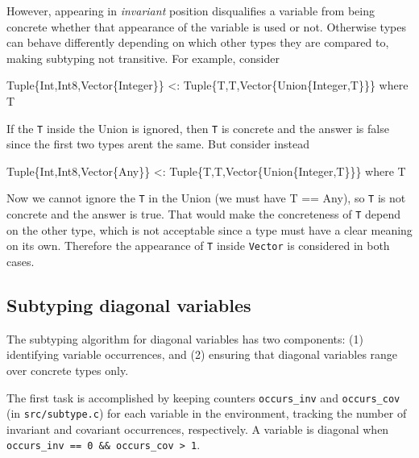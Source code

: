 However, appearing in \emph{invariant} position disqualifies a variable from being concrete whether that appearance of the variable is used or not. Otherwise types can behave differently depending on which other types they are compared to, making subtyping not transitive. For example, consider



Tuple\{Int,Int8,Vector\{Integer\}\} <: Tuple\{T,T,Vector\{Union\{Integer,T\}\}\} where T



If the \texttt{T} inside the Union is ignored, then \texttt{T} is concrete and the answer is {\textquotedbl}false{\textquotedbl} since the first two types aren{\textquotesingle}t the same. But consider instead



Tuple\{Int,Int8,Vector\{Any\}\} <: Tuple\{T,T,Vector\{Union\{Integer,T\}\}\} where T



Now we cannot ignore the \texttt{T} in the Union (we must have T == Any), so \texttt{T} is not concrete and the answer is {\textquotedbl}true{\textquotedbl}. That would make the concreteness of \texttt{T} depend on the other type, which is not acceptable since a type must have a clear meaning on its own. Therefore the appearance of \texttt{T} inside \texttt{Vector} is considered in both cases.



\hypertarget{12600482412457091491}{}


\subsection{Subtyping diagonal variables}



The subtyping algorithm for diagonal variables has two components: (1) identifying variable occurrences, and (2) ensuring that diagonal variables range over concrete types only.



The first task is accomplished by keeping counters \texttt{occurs\_inv} and \texttt{occurs\_cov} (in \texttt{src/subtype.c}) for each variable in the environment, tracking the number of invariant and covariant occurrences, respectively. A variable is diagonal when \texttt{occurs\_inv == 0 \&\& occurs\_cov > 1}.




